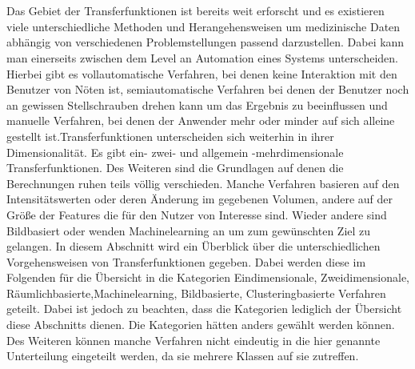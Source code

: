 \chapter{}
\label{sec:state_of_the_art}






Das Gebiet der Transferfunktionen ist bereits weit erforscht und es existieren viele unterschiedliche Methoden und Herangehensweisen um medizinische Daten abhängig von verschiedenen Problemstellungen passend darzustellen.
\newline
{}
Dabei kann man einerseits zwischen dem Level an Automation eines Systems unterscheiden. Hierbei gibt es vollautomatische Verfahren, bei denen keine Interaktion mit den Benutzer von Nöten ist, semiautomatische Verfahren bei denen der Benutzer noch an gewissen Stellschrauben drehen kann um das Ergebnis zu beeinflussen und manuelle Verfahren, bei denen der Anwender mehr oder minder auf sich alleine gestellt ist.Transferfunktionen unterscheiden sich weiterhin in ihrer Dimensionalität. Es gibt ein- zwei- und allgemein -mehrdimensionale Transferfunktionen. Des Weiteren sind die Grundlagen auf denen die Berechnungen ruhen teils völlig verschieden. Manche Verfahren basieren auf den Intensitätswerten oder deren Änderung im gegebenen Volumen, andere auf der Größe der Features die für den Nutzer von Interesse sind. Wieder andere sind Bildbasiert oder wenden Machinelearning an um zum gewünschten Ziel zu gelangen.
\newline
In diesem Abschnitt wird ein Überblick über die unterschiedlichen Vorgehensweisen von Transferfunktionen gegeben. Dabei werden diese im Folgenden für die Übersicht in die Kategorien Eindimensionale, Zweidimensionale, Räumlichbasierte,Machinelearning, Bildbasierte, Clusteringbasierte Verfahren geteilt.
\newline
{}
Dabei ist jedoch zu beachten, dass die Kategorien lediglich der Übersicht diese Abschnitts dienen. Die Kategorien hätten anders gewählt werden können. Des Weiteren können manche Verfahren nicht eindeutig in die hier genannte Unterteilung eingeteilt werden, da sie mehrere Klassen auf sie zutreffen. 







